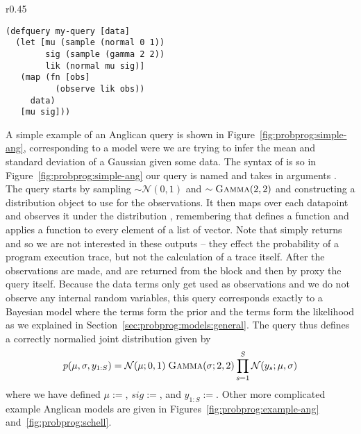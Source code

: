 \begin{wrapfigure}{r}{0.45\textwidth}
	\centering 
	\vspace{-10pt}
	\begin{lstlisting}[basicstyle=\ttfamily\small]
(defquery my-query [data]
  (let [mu (sample (normal 0 1))
        sig (sample (gamma 2 2))
        lik (normal mu sig)]
   (map (fn [obs]
          (observe lik obs))
     data)
   [mu sig]))
	\end{lstlisting}	
	\vspace{-5pt}
	\caption{A simple Anglican query.\label{fig:probprog:simple-ang}}
	\vspace{-10pt}
\end{wrapfigure}
A simple example of an Anglican query is shown in Figure~\ref{fig:probprog:simple-ang},
corresponding to a model were we are trying to infer the mean and standard deviation
of a Gaussian given some data.  The syntax of  is {\small {}}
so in Figure~\ref{fig:probprog:simple-ang} our query is named {\small {}} and takes
in arguments {\small {}}.  The query starts by sampling {\small {}}$\sim\mathcal{N}(0,1)$
and {\small {}}$\sim\textsc{Gamma}(2,2)$ and constructing a distribution object {\small {}}
to use for the observations.  It then maps over each datapoint and observes it under the distribution
{\small {}}, remembering that {\small {}} defines a function and \map applies a function
to every element of a list of vector.  
Note that \observe simply returns {\small {}} and so we
are not interested in these outputs -- they effect the probability of a program execution trace, but
not the calculation of a trace itself.  After the observations are made, {\small {}} and {\small {}}
are returned from the \cllet block and then by proxy the query itself.
Because the data terms only get used as observations and we do
not observe any internal random variables, this query corresponds exactly to a Bayesian model where
the \sample terms form the prior and the \observe terms form the likelihood as we explained in
Section~\ref{sec:probprog:models:general}.  The query thus defines a correctly normalied joint
distribution given by
\begin{align}
p(\mu,\sigma,y_{1:S}) = \mathcal{N}(\mu ; 0,1) \; \textsc{Gamma}(\sigma ; 2, 2) \prod_{s=1}^{S} \mathcal{N}(y_s ; \mu, \sigma)
\end{align}
where we have defined $\mu:=${\small {}}, $sig:=${\small {}}, and $y_{1:S}:=${\small {}}.
Other more complicated example Anglican models are given in Figures~\ref{fig:probprog:example-ang}
and~\ref{fig:probprog:schell}.

